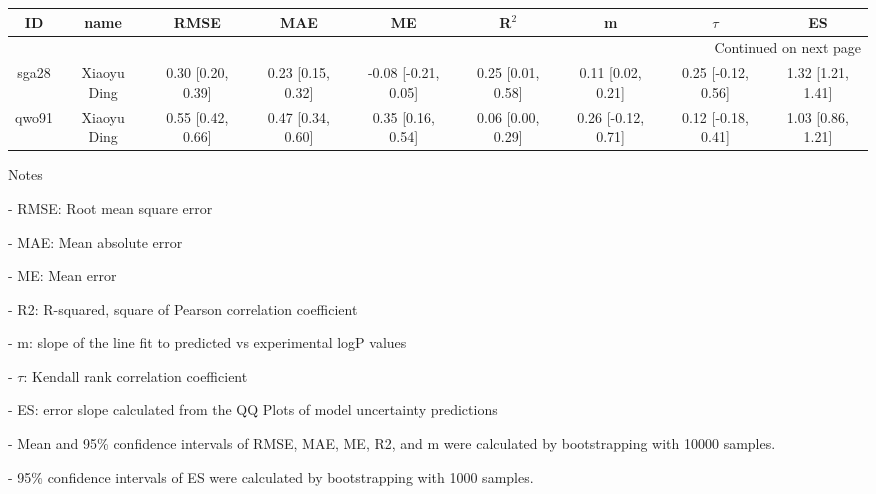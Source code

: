\documentclass{article}
\begin{document}
\begin{center}
\scriptsize
\begin{longtable}{|ccccccccc|}
\toprule
    ID &         name &               RMSE &                MAE &                   ME &              R$^2$ &                   m &              $\tau$ &                 ES \\
\midrule
\endhead
\midrule
\multicolumn{9}{r}{{Continued on next page}} \\
\midrule
\endfoot

\bottomrule
\endlastfoot
 sga28 &  Xiaoyu Ding &  0.30 [0.20, 0.39] &  0.23 [0.15, 0.32] &  -0.08 [-0.21, 0.05] &  0.25 [0.01, 0.58] &   0.11 [0.02, 0.21] &  0.25 [-0.12, 0.56] &  1.32 [1.21, 1.41] \\
 qwo91 &  Xiaoyu Ding &  0.55 [0.42, 0.66] &  0.47 [0.34, 0.60] &    0.35 [0.16, 0.54] &  0.06 [0.00, 0.29] &  0.26 [-0.12, 0.71] &  0.12 [-0.18, 0.41] &  1.03 [0.86, 1.21] \\
\end{longtable}
\end{center}

Notes

- RMSE: Root mean square error

- MAE: Mean absolute error

- ME: Mean error

- R2: R-squared, square of Pearson correlation coefficient

- m: slope of the line fit to predicted vs experimental logP values

- $\tau$:  Kendall rank correlation coefficient

- ES: error slope calculated from the QQ Plots of model uncertainty predictions

- Mean and 95\% confidence intervals of RMSE, MAE, ME, R2, and m were calculated by bootstrapping with 10000 samples.

- 95\% confidence intervals of ES were calculated by bootstrapping with 1000 samples.\end{document}
\end{document}
